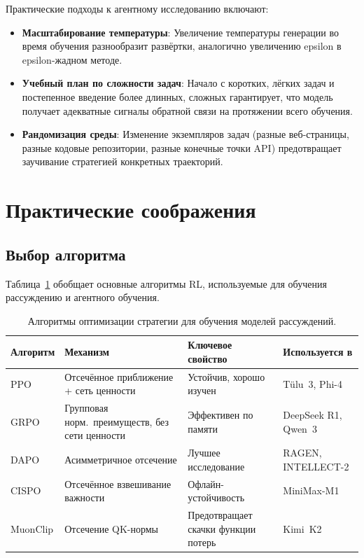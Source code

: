 Практические подходы к агентному исследованию включают:

\begin{itemize}[leftmargin=*]
\item \textbf{Масштабирование температуры}: Увеличение температуры генерации
  во время обучения разнообразит развёртки, аналогично увеличению
  epsilon в epsilon-жадном методе.

\item \textbf{Учебный план по сложности задач}: Начало с коротких,
  лёгких задач и постепенное введение более длинных, сложных гарантирует,
  что модель получает адекватные сигналы обратной связи на протяжении всего обучения.

\item \textbf{Рандомизация среды}: Изменение экземпляров задач
  (разные веб-страницы, разные кодовые репозитории, разные конечные точки API)
  предотвращает заучивание стратегией конкретных траекторий.
\end{itemize}

\section{Практические соображения}
\label{sec:practical-reasoning}

\subsection{Выбор алгоритма}
\label{subsec:algorithm-choices}

Таблица~\ref{tab:reasoning-algorithms} обобщает основные алгоритмы RL,
используемые для обучения рассуждению и агентного обучения.

\begin{table}[ht]
\centering
\footnotesize
\caption{Алгоритмы оптимизации стратегии для обучения моделей рассуждений.}
\label{tab:reasoning-algorithms}
\begin{tabular}{@{}lp{3.5cm}p{2.5cm}p{2.5cm}@{}}
\toprule
\textbf{Алгоритм} & \textbf{Механизм} & \textbf{Ключевое свойство}
  & \textbf{Используется в} \\
\midrule
PPO & Отсечённое приближение + сеть ценности
  & Устойчив, хорошо изучен & Tülu~3, Phi-4 \\
GRPO & Групповая норм.\  преимуществ, без сети ценности
  & Эффективен по памяти & DeepSeek R1, Qwen~3 \\
DAPO & Асимметричное отсечение
  & Лучшее исследование & RAGEN, INTELLECT-2 \\
CISPO & Отсечённое взвешивание важности
  & Офлайн-устойчивость & MiniMax-M1 \\
MuonClip & Отсечение QK-нормы
  & Предотвращает скачки функции потерь & Kimi~K2 \\
\bottomrule
\end{tabular}
\end{table}


